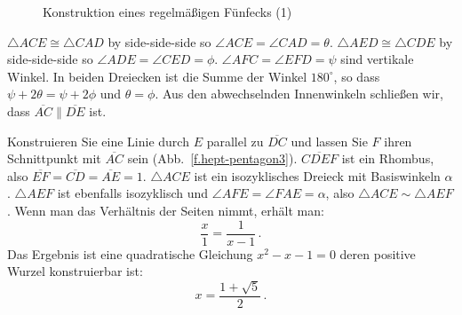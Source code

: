\begin{figure}[t]
\begin{center}
\end{center}
\caption{Konstruktion eines regelmäßigen Fünfecks (1)}\label{f.hept-pentagon2}
\end{figure}
$\triangle ACE\cong \triangle CAD$ by side-side-side so $\angle ACE=\angle CAD=\theta$. $\triangle AED\cong \triangle CDE$ by side-side-side so $\angle ADE=\angle CED=\phi$. $\angle AFC=\angle EFD=\psi$ sind vertikale Winkel. In beiden Dreiecken ist die Summe der Winkel $180^\circ$, so dass
$\psi+2\theta=\psi+ 2\phi$ und $\theta=\phi$.
Aus den abwechselnden Innenwinkeln schließen wir, dass $\overline{AC}\parallel \overline{DE}$ ist.

Konstruieren Sie eine Linie durch $E$ parallel zu $\overline{DC}$ und lassen Sie $F$ ihren Schnittpunkt mit $\overline{AC}$ sein (Abb.~\ref{f.hept-pentagon3}). $\overline{CDEF}$ ist ein Rhombus, also $\overline{EF}=\overline{CD}=\overline{AE}=1$. $\triangle ACE$ ist ein isozyklisches Dreieck mit Basiswinkeln $\alpha$. $\triangle AEF$ ist ebenfalls isozyklisch und $\angle AFE=\angle FAE=\alpha$, also $\triangle ACE\sim\triangle AEF$. Wenn man das Verhältnis der Seiten nimmt, erhält man:
\[
\frac{x}{1}=\frac{1}{x-1}\,.
\]
Das Ergebnis ist eine quadratische Gleichung $x^2-x-1=0$
deren positive Wurzel konstruierbar ist:
\[
x=\frac{1+\sqrt{5}}{2}\,.
\]

